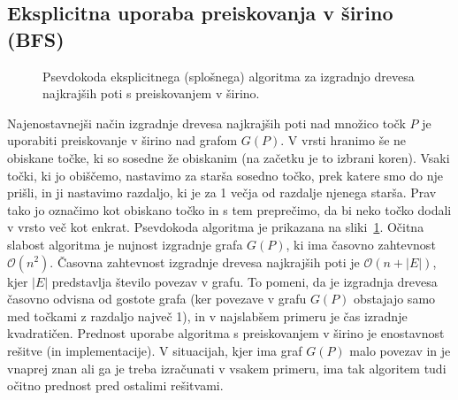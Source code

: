 \documentclass[a4paper, 12pt]{book}
\newcommand{\OO}{\ensuremath{\mathcal{O}}} %
\begin{document}
\subsection{Eksplicitna uporaba preiskovanja v širino (BFS)}
\label{bfs-theory}
\begin{figure}[htb]
\begin{center}
\end{center}
\caption{Psevdokoda eksplicitnega (splošnega) algoritma za izgradnjo drevesa najkrajših poti s preiskovanjem v širino.}
\label{fig:genericBfs}
\end{figure}

Najenostavnejši način izgradnje drevesa najkrajših poti nad množico točk $P$ je uporabiti preiskovanje v širino nad grafom $G(P)$. V vrsti hranimo še ne obiskane točke, ki so sosedne že obiskanim (na začetku je to izbrani koren). Vsaki točki, ki jo obiščemo, nastavimo za starša sosedno točko, prek katere smo do nje prišli, in ji nastavimo razdaljo, ki je za 1 večja od razdalje njenega starša. Prav tako jo označimo kot obiskano točko in s tem preprečimo, da bi neko točko dodali v vrsto več kot enkrat. Psevdokoda algoritma je prikazana na sliki~\ref{fig:genericBfs}. Očitna slabost algoritma je nujnost izgradnje grafa $G(P)$, ki ima časovno zahtevnost $\OO(n^2)$. Časovna zahtevnost izgradnje drevesa najkrajših poti je $\OO(n + |E|)$, kjer $|E|$ predstavlja število povezav v grafu. To pomeni, da je izgradnja drevesa časovno odvisna od gostote grafa (ker povezave v grafu $G(P)$ obstajajo samo med točkami z razdaljo največ 1), in v najslabšem primeru je čas izradnje kvadratičen. Prednost uporabe algoritma s preiskovanjem v širino je enostavnost rešitve (in implementacije). V situacijah, kjer ima graf $G(P)$ malo povezav in je vnaprej znan ali ga je treba izračunati v vsakem primeru, ima tak algoritem tudi očitno prednost pred ostalimi rešitvami. 
\end{document}
